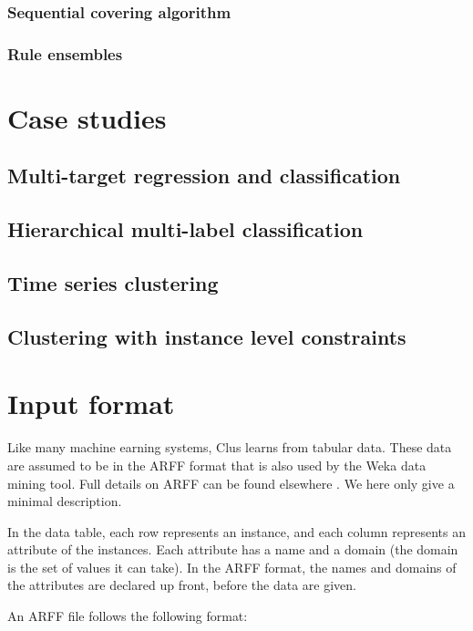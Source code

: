 \documentclass[a4paper]{report}
\begin{document}
\subsection{Sequential covering algorithm}

\subsection{Rule ensembles}

\chapter{Case studies}

\section{Multi-target regression and classification}

\section{Hierarchical multi-label classification}

\section{Time series clustering}

\section{Clustering with instance level constraints}

\chapter{Input format}

Like many machine earning systems, Clus learns from tabular data.
These data are assumed to be in the ARFF format that is also used by the Weka data mining tool.  Full details on ARFF can be found elsewhere \cite{arff?}.
We here only give a minimal description.

In the data table, each row represents an instance, and each column represents an attribute of the instances.  Each attribute has a name and a domain (the domain is the set of values it can take).  In the ARFF format, the names and domains of the attributes are declared up front, before the data are given.

An ARFF file follows the following format:
\end{document}
